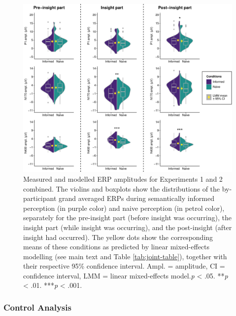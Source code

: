 \documentclass[
  english,
  doc,12pt,twoside,floatsintext]{apa7}
\begin{document}
\begin{figure}

{\centering \includegraphics[width=1\linewidth]{master_thesis_files/figure-latex/joint-plot-1} 

}

\caption{Measured and modelled ERP amplitudes for Experiments 1 and 2 combined. The violins and boxplots show the distributions of the by-participant grand averaged ERPs during semantically informed perception (in purple color) and naive perception (in petrol color), separately for the pre-insight part (before insight was occurring), the insight part (while insight was occurring), and the post-insight (after insight had occurred). The yellow dots show the corresponding means of these conditions as predicted by linear mixed-effects modelling (see main text and Table \ref{tab:joint-table}), together with their respective 95\% confidence interval. Ampl. = amplitude, CI = confidence interval, LMM = linear mixed-effects model.\newline*\emph{p} \textless{} .05. **\emph{p} \textless{} .01. ***\emph{p} \textless{} .001.}\label{fig:joint-plot}
\end{figure}

\hypertarget{control-analysis}{%
\subsubsection{Control Analysis}\label{control-analysis}}
\end{document}
